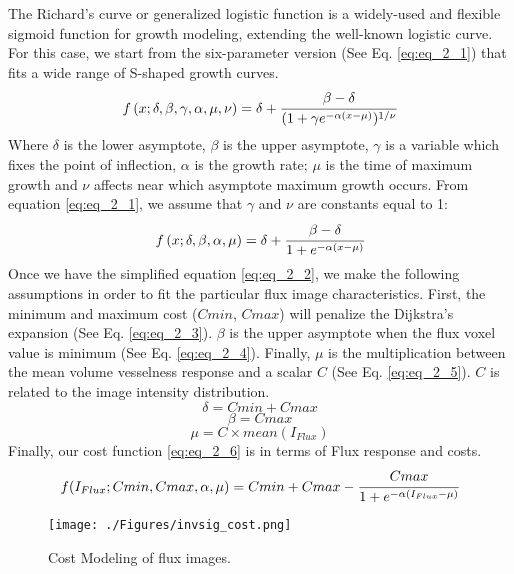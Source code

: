 The Richard's curve \citep{Richards1959} or generalized logistic function is a widely-used and flexible sigmoid function for growth modeling, extending the well-known logistic curve. For this case, we start from the six-parameter version (See Eq. \ref{eq:eq_2_1}) that fits a wide range of S-shaped growth curves. 
\begin{equation}
\label{eq:eq_2_1}
f\left( x;\delta,\beta,\gamma,\alpha,\mu,\nu\right) = \delta + \cfrac{\beta-\delta}{(1+\gamma e^{-\alpha(x-\mu)})^{1/\nu}}
\end{equation}
Where $\delta$ is the lower asymptote, $\beta$ is the upper asymptote, $\gamma$ is a variable which fixes the point of inflection, $\alpha$ is the growth rate; $\mu$ is the time of maximum growth and $\nu$ affects near which asymptote maximum growth occurs.
From equation \ref{eq:eq_2_1}, we assume that $\gamma$ and $\nu$ are constants equal to 1:
\begin{equation}
\label{eq:eq_2_2}
f\left( x;\delta,\beta,\alpha,\mu\right) = \delta + \cfrac{\beta-\delta}{1+e^{-\alpha(x-\mu)}}
\end{equation}
Once we have the simplified equation \ref{eq:eq_2_2}, we make the following assumptions in order to fit the particular flux image characteristics. First, the minimum and maximum cost ($Cmin$, $Cmax$) will penalize the Dijkstra's expansion (See Eq. \ref{eq:eq_2_3}). $\beta$ is the upper asymptote when the flux voxel value is minimum (See Eq. \ref{eq:eq_2_4}). Finally, $\mu$ is the multiplication between the mean volume vesselness response and a scalar $C$ (See Eq. \ref{eq:eq_2_5}). $C$ is related to the image intensity distribution.
\begin{equation}
\label{eq:eq_2_3}
\delta = Cmin + Cmax
\end{equation}
\begin{equation}
\label{eq:eq_2_4}
\beta = Cmax
\end{equation}
\begin{equation}
\label{eq:eq_2_5}
\mu = C \times mean(I_{Flux}) 
\end{equation}
Finally, our cost function \ref{eq:eq_2_6} is in terms of Flux response and costs.
\begin{equation}
\label{eq:eq_2_6}
f( I_{Flux};Cmin, Cmax, \alpha,\mu) = Cmin + Cmax - \cfrac{Cmax}{1+e^{-\alpha(I_{Flux}-\mu)}}
\end{equation}

\begin{figure}[ht]
	\centering
		\texttt{[image: ./Figures/invsig\_cost.png]}
	\caption[Cost Function]{Cost Modeling of flux images.}
	\label{fig:inv_cost}
\end{figure}

